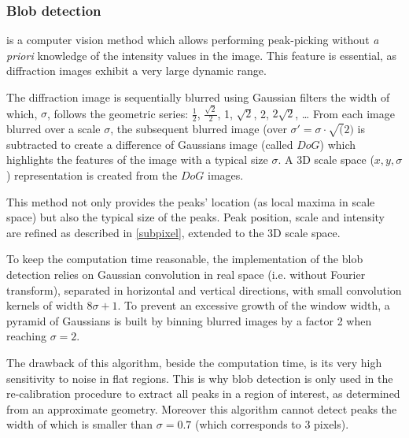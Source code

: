 \documentclass{iucr}
\begin{document}
\subsubsection{Blob detection}
\label{blob}
is a computer vision method which allows performing peak-picking without
\textit{a priori} knowledge of the intensity values in the image.
This feature is essential, as diffraction images exhibit a very large
dynamic range.

The diffraction image is sequentially blurred using Gaussian filters the 
width of which, $\sigma$, follows the geometric series: $\frac{1}{2}$,
$\frac{\sqrt{2}}{2}$, 1, $\sqrt{2}$, 2, $2\sqrt{2}$, \ldots
From each image blurred over a scale $\sigma$, the subsequent
blurred image (over $\sigma'=\sigma\cdot\sqrt(2)$
is subtracted to create a difference of Gaussians
image (called $DoG$) which highlights the features of the image with a typical
size $\sigma$.
A 3D scale space ($x,y,\sigma$) representation is created from the $DoG$
images.

This method  not only provides the peaks' location (as local maxima in
scale space) but also the typical size of the peaks.
Peak position, scale and intensity are refined as described in
\ref{subpixel}, extended to the 3D scale space.

To keep the computation time reasonable, the implementation of the blob
detection relies on Gaussian convolution in real space (i.e. without Fourier
transform), separated in horizontal and vertical directions, with small
convolution kernels of width $8 \sigma +1$.
To prevent an excessive growth of the window width, a pyramid
of Gaussians is built by binning blurred images by a factor 2 when reaching
$\sigma=2$.

The drawback of this algorithm, beside the computation time, is its very high
sensitivity to noise in flat regions.
This is why blob detection is only used in the re-calibration procedure to
extract all peaks in a region of interest, as determined from an
approximate geometry.
Moreover this algorithm cannot detect peaks the width of which is smaller than
$\sigma=0.7$ (which corresponds to 3 pixels).
\end{document}
